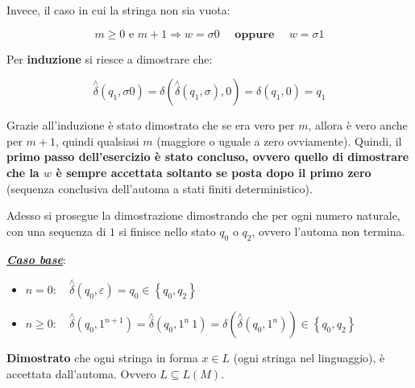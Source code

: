 \documentclass[a4paper]{article}
\begin{document}
	\noindent
	Invece, il caso in cui la stringa non sia vuota:
	
	\begin{equation*}
		m \ge 0 \text { e } m+1 \Longrightarrow w = \sigma 0 \hspace{1em} \textbf{ oppure } \hspace{1em} w = \sigma 1
	\end{equation*}

	\noindent
	Per \textbf{induzione} si riesce a dimostrare che:
	
	\begin{equation*}
		\overset{\wedge}{\delta} \left(q_{1}, \sigma 0\right) = \delta\left(\overset{\wedge}{\delta} \left(q_{1}, \sigma\right), 0\right) = \delta \left(q_{1}, 0\right) = q_{1}
	\end{equation*}
	
	\noindent
	Grazie all'induzione è stato dimostrato che se era vero per $m$, allora è vero anche per $m+1$, quindi qualsiasi $m$ (maggiore o uguale a zero ovviamente). Quindi, il \textbf{primo passo dell'esercizio è stato concluso, ovvero quello di dimostrare che la $w$ è sempre accettata soltanto se posta dopo il primo zero} (sequenza conclusiva dell'automa a stati finiti deterministico).\newline
	
	Adesso si prosegue la dimostrazione dimostrando che per ogni numero naturale, con una sequenza di $1$ si finisce nello stato $q_{0}$ o $q_{2}$, ovvero l'automa non termina.
	
	
	\noindent
	\textbf{\emph{\underline{Caso base}}}:
	
	
	\begin{itemize}
		\item $n = 0: \hspace{1em} \overset{\wedge}{\delta} \left(q_{0}, \varepsilon\right) = q_{0} \in \left\{q_{0}, q_{2}\right\}$
		\item $n \ge 0: \hspace{1em} \overset{\wedge}{\delta} \left(q_{0}, 1^{n+1}\right) = \overset{\wedge}{\delta} \left(q_{0}, 1^{n} \: 1\right) = \delta \left(\overset{\wedge}{\delta} \left(q_{0}, 1^{n}\right)\right) \in \left\{q_{0}, q_{2}\right\}$
	\end{itemize}

	\noindent
	\textcolor{Green4}{\textbf{\checkmark Dimostrato}} che ogni stringa in forma $x \in L$ (ogni stringa nel linguaggio), è accettata dall'automa. Ovvero $L \subseteq L\left(M\right)$.\newline
	
\end{document}
